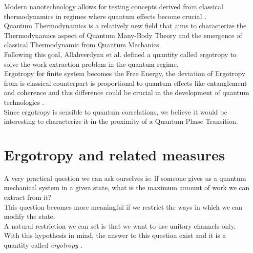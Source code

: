 \documentclass[12pt,a4paper]{book}
\theoremstyle{definition}
\begin{document}
Modern nanotechnology allows 
for testing concepts derived from classical thermodynamics
in regimes where quantum effects become crucial  \cite{PhysRevX.7.031044} \cite{Rossnagel_2016} \cite{Scully862}.\\
Quantum Thermodynamics \cite{Gemmer2010} \cite{deffner2019quantum} is a relatively new field that aims to characterize the Thermodynamics aspect of Quantum Many-Body Theory and the emergence of classical Thermodynamic from Quantum Mechanics. \\
Following this goal, Allahverdyan et al. \cite{allahverdyan2004maximal}  defined a quantity called ergotropy to solve the work extraction problem in the quantum regime.\\
Ergotropy for finite system becomes the Free Energy, the deviation of Ergotropy from is classical counterpart is proportional to quantum effects like entanglement and coherence \cite{PhysRevA.99.052320} \cite{Francica2017} and this difference could be crucial in the development of quantum technologies  \cite{PhysRevE.87.042123} .\\
Since ergotropy is sensible to quantum correlations, we believe it would be interesting to characterize it in the proximity of a  Quantum Phase Transition.

\clearpage


\chapter{Ergotropy and related measures}\label{sec:measures}
A very practical question we can ask ourselves is: If someone gives us a quantum mechanical system in a given state, what is the maximum amount of work we can extract from it?\\ 
This question becomes more meaningful if we restrict the ways in which we can modify the state.\\
A natural restriction we can set is that we want to use unitary channels only.\\
With this hypothesis in mind, the answer to this question exist and it is a quantity called \textit{ergotropy}
\cite{allahverdyan2004maximal}.\\
\end{document}
